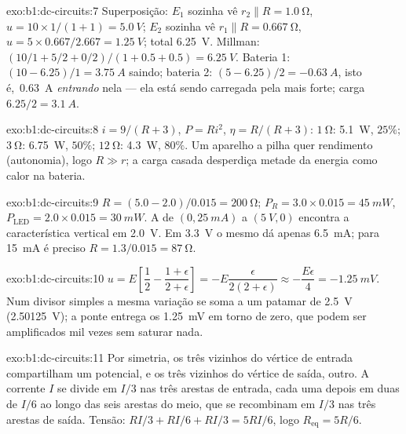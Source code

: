 \begin{solution}{exo:b1:dc-circuits:7}
Superposição: $E_1$ sozinha vê $r_2 \parallel R = \qty{1.0}{\ohm}$,
$u = 10 \times 1/(1 + 1) = \qty{5.0}{V}$; $E_2$ sozinha vê $r_1 \parallel R
= \qty{0.667}{\ohm}$, $u = 5 \times 0.667/2.667 = \qty{1.25}{V}$; total
\qty{6.25}{V}. Millman: $(10/1 + 5/2 + 0/2)/(1 + 0.5 + 0.5) = \qty{6.25}{V}$.
Bateria 1: $(10 - 6.25)/1 = \qty{3.75}{A}$ saindo; bateria 2: $(5 - 6.25)/2
= \qty{-0.63}{A}$, isto é,\ \qty{0.63}{A} \emph{entrando} nela --- ela está sendo
carregada pela mais forte; carga $6.25/2 = \qty{3.1}{A}$.
\end{solution}

\begin{solution}{exo:b1:dc-circuits:8}
$i = 9/(R + 3)$, $P = Ri^2$, $\eta = R/(R + 3)$: $\qty{1}{\ohm}$:
\qty{5.1}{W}, $25\%$; $\qty{3}{\ohm}$: \qty{6.75}{W}, $50\%$;
$\qty{12}{\ohm}$: \qty{4.3}{W}, $80\%$. Um aparelho a pilha quer
rendimento (autonomia), logo $R \gg r$; a carga casada desperdiça metade
da energia como calor na bateria.
\end{solution}

\begin{solution}{exo:b1:dc-circuits:9}
$R = (5.0 - 2.0)/0.015 = \qty{200}{\ohm}$; $P_R = 3.0 \times 0.015 =
\qty{45}{mW}$, $P_{\mathrm{LED}} = 2.0 \times 0.015 = \qty{30}{mW}$. A  de $(0, \qty{25}{mA})$ a $(\qty{5}{V}, 0)$ encontra a característica
vertical em \qty{2.0}{V}. Em \qty{3.3}{V} o mesmo  dá
apenas \qty{6.5}{mA}; para \qty{15}{mA} é preciso $R = 1.3/0.015 =
\qty{87}{\ohm}$.
\end{solution}

\begin{solution}{exo:b1:dc-circuits:10}
$u = E\left[\dfrac12 - \dfrac{1 + \epsilon}{2 + \epsilon}\right] =
-E\dfrac{\epsilon}{2(2 + \epsilon)} \approx -\dfrac{E\epsilon}{4} =
\qty{-1.25}{mV}$. Num divisor simples a mesma variação se soma a um
patamar de \qty{2.5}{V} (\qty{2.50125}{V}); a ponte entrega os
\qty{1.25}{mV} em torno de zero, que podem ser amplificados mil vezes
sem saturar nada.
\end{solution}

\begin{solution}{exo:b1:dc-circuits:11}
Por simetria, os três vizinhos do vértice de entrada compartilham um
potencial, e os três vizinhos do vértice de saída, outro. A corrente
$I$ se divide em $I/3$ nas três arestas de entrada, cada uma depois em duas de
$I/6$ ao longo das seis arestas do meio, que se recombinam em $I/3$ nas
três arestas de saída. Tensão: $RI/3 + RI/6 + RI/3 = 5RI/6$, logo
$R_{\mathrm{eq}} = 5R/6$.
\end{solution}

